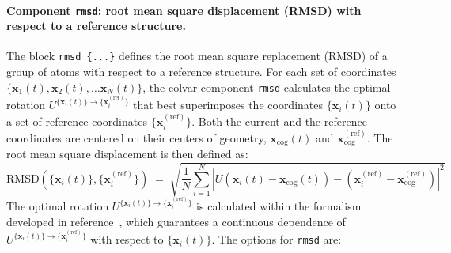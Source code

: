 \paragraph*{Component \texttt{rmsd}: root mean square displacement
  (RMSD) with respect to a reference structure.}  The block
\texttt{rmsd~\{...\}} defines the root mean square replacement
(RMSD) of a group of atoms with respect to a reference structure.  For
each set of coordinates $\{ \mathbf{x}_1(t), \mathbf{x}_2(t), \ldots
\mathbf{x}_N(t) \}$, the colvar component \texttt{rmsd} calculates the
optimal rotation
$U^{\{\mathbf{x}_i(t)\}\rightarrow\{\mathbf{x}_i^{\mathrm{(ref)}}\}}$
that best superimposes the coordinates $\{\mathbf{x}_i(t)\}$ onto a
set of reference coordinates $\{\mathbf{x}_i^{\mathrm{(ref)}}\}$.
Both the current and the reference coordinates are centered on their
centers of geometry, $\mathbf{x}_{\mathrm{cog}}(t)$ and
$\mathbf{x}_{\mathrm{cog}}^{\mathrm{(ref)}}$.  The root mean square
displacement is then defined as:
\begin{equation}
  \label{eq:cvc_rmsd}
  { \mathrm{RMSD}(\{\mathbf{x}_i(t)\},
    \{\mathbf{x}_i^{\mathrm{(ref)}}\}) } \; = \; \sqrt{
    \frac{1}{N} \sum_{i=1}^{N} \left|
      U
      \left(\mathbf{x}_i(t) - \mathbf{x}_{\mathrm{cog}}(t)\right) -
      \left(\mathbf{x}_i^{\mathrm{(ref)}} -
        \mathbf{x}_{\mathrm{cog}}^{\mathrm{(ref)}} \right) \right|^{2} }
\end{equation}
The optimal rotation
$U^{\{\mathbf{x}_i(t)\}\rightarrow\{\mathbf{x}_i^{\mathrm{(ref)}}\}}$
is calculated within the formalism developed in
reference~\cite{Coutsias2004}, which guarantees a continuous
dependence of
$U^{\{\mathbf{x}_i(t)\}\rightarrow\{\mathbf{x}_i^{\mathrm{(ref)}}\}}$
with respect to $\{\mathbf{x}_i(t)\}$.  The options for \texttt{rmsd}
are:
